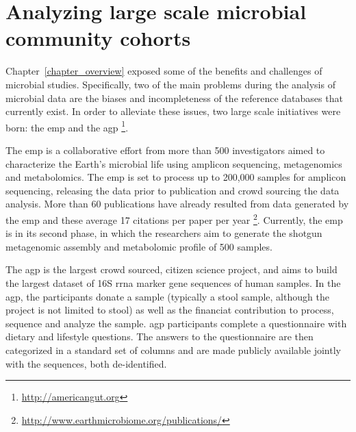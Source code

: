 \documentclass[12pt,chapterheads]{ucsd}
\begin{document}
\chapter{Analyzing large scale microbial community cohorts}\label{chapter_book}
\glsresetall

Chapter~\ref{chapter_overview} exposed some of the benefits and challenges of
microbial studies. Specifically, two of the main problems during the analysis
of microbial data are the biases and incompleteness of the reference databases
that currently exist. In order to alleviate these issues, two large scale
initiatives were born: the \gls{emp} \cite{Gilbert2010, Gilbert2014} and the
\gls{agp} \footnote{\label{agpurl}\url{http://americangut.org}}.

The \gls{emp} is a collaborative effort from more than 500 investigators aimed
to characterize the Earth's microbial life using amplicon sequencing,
metagenomics and metabolomics. The \gls{emp} is set to process up to 200,000
samples for amplicon sequencing, releasing the data prior to publication and
crowd sourcing the data analysis. More than 60 publications have already resulted
from data generated by the \gls{emp} and these average 17 citations per paper per year
\footnote{\label{emppuburl}\url{http://www.earthmicrobiome.org/publications/}}.
Currently, the \gls{emp} is in its second phase, in which the researchers aim to
generate the shotgun metagenomic assembly and metabolomic profile of 500 samples.

The \gls{agp} is the largest crowd sourced, citizen science project, and aims to
build the largest dataset of 16S \gls{rrna} marker gene sequences of human samples.
In the \gls{agp}, the participants donate a sample (typically a stool sample,
although the project is not limited to stool) as well as the financiat contribution to
process, sequence and analyze the sample. \gls{agp} participants complete a
questionnaire with dietary and lifestyle questions. The answers to the
questionnaire are then categorized in a standard set of columns and are
made publicly available jointly with the sequences, both de-identified.
\end{document}
